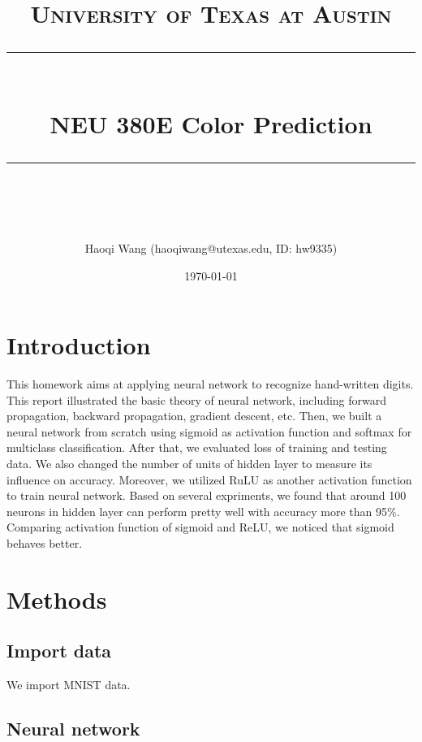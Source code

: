 \documentclass[11pt]{scrartcl} %
\title{	
	\normalfont\normalsize
	\textsc{University of Texas at Austin}\\ %
	\vspace{25pt} %
	\rule{\linewidth}{0.5pt}\\ %
	\vspace{20pt} %
	{\huge NEU 380E Color Prediction}\\ %
	\vspace{12pt} %
	\rule{\linewidth}{2pt}\\ %
	\vspace{12pt} %
}
\author{\LARGE Haoqi Wang (haoqiwang@utexas.edu, ID: hw9335)} %
\date{\normalsize\today} %
\begin{document}
\maketitle %


\section{Introduction}

This homework aims at applying neural network to recognize hand-written digits. This report illustrated the basic theory of neural network, including forward propagation, backward propagation, gradient descent, etc. Then, we built a neural network from scratch using sigmoid as activation function and softmax for multiclass classification. After that, we evaluated loss of training and testing data. We also changed the number of units of hidden layer to measure its influence on accuracy. Moreover, we utilized RuLU as another activation function to train neural network. Based on several expriments, we found that around 100 neurons in hidden layer can perform pretty well with accuracy more than 95\%. Comparing activation function of sigmoid and ReLU, we noticed that sigmoid behaves better.




%


\section{Methods}

\subsection{Import data}

We import MNIST data.

\subsection{Neural network}
\end{document}
